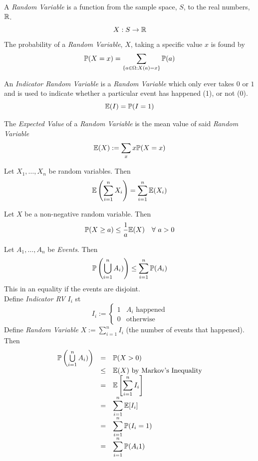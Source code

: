 \documentclass[11pt,a4paper]{article}
\begin{document}
A \textit{Random Variable} is a function from the sample space, $S$, to the real numbers, $\mathbb{R}$.\\
$$X:S\to\mathbb{R}$$
The probability of a \textit{Random Variable}, $X$, taking a specific value $x$ is found by
$$\mathbb{P}(X=x)=\sum_{\{a\in \Omega:X(a)=x\}}\mathbb{P}(a)$$

An \textit{Indicator Random Variable} is a \textit{Random Variable} which only ever takes $0$ or $1$ and is used to indicate whether a particular event has happened (1), or not (0).
$$\mathbb{E}(I)=\mathbb{P}(I=1)$$

The \textit{Expected Value} of a \textit{Random Variable} is the mean value of said \textit{Random Variable}
$$\mathbb{E}(X):=\sum_x x\mathbb{P}(X=x)$$

Let $X_1,\dots,X_n$ be random variables. Then
$$\mathbb{E}\left(\sum_{i=1}^nX_i\right)=\sum_{i=1}^n\mathbb{E}(X_i)$$

Let $X$ be a non-negative random variable. Then
$$\prob(X\geq a)\leq\frac1a\expect(X)\quad\forall\ a>0$$

Let $A_1,\dots,A_n$ be \textit{Events}. Then
$$\mathbb{P}\left(\bigcup\limits_{i=1}^nA_i)\right)\leq\sum_{i=1}^n\mathbb{P}(A_i)$$
\nb This in an equality if the events are disjoint.\\

Define \textit{Indicator RV} $I_i$ st
$$I_i:=\begin{cases}1&A_i\text{ happened}\\0&\text{otherwise}\end{cases}$$
Define \textit{Random Variable} $X:=\sum_{i=1}^nI_i$ (the number of events that happened).\\
Then
\[\begin{array}{rcl}
\mathbb{P}\left(\bigcup\limits_{i=1}^nA_i)\right)&=&\mathbb{P}(X>0)\\
&\leq&\mathbb{E}(X)\text{ by Markov's Inequality}\\
&=&\mathbb{E}\left[\displaystyle\sum_{i=1}^nI_i\right]\\
&=&\displaystyle\sum_{i=1}^n\mathbb{E}[I_i]\\
&=&\displaystyle\sum_{i=1}^n\mathbb{P}(I_i=1)\\
&=&\displaystyle\sum_{i=1}^n\mathbb{P}(A_i1)
\end{array}\]
\proved
\end{document}
